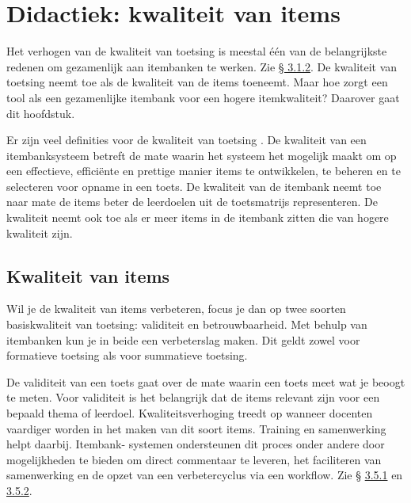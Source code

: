 \documentclass[
]{book}
\begin{document}
\hypertarget{didactiek-kwaliteit-van-items}{%
\section{Didactiek: kwaliteit van items}\label{didactiek-kwaliteit-van-items}}

Het verhogen van de kwaliteit van toetsing is meestal één van de belangrijkste redenen om gezamenlijk aan itembanken te werken. Zie \protect\hyperlink{waarom-samenwerken-aan-een-itembank}{§ 3.1.2}. De kwaliteit van toetsing neemt toe als de kwaliteit van de items toeneemt. Maar hoe zorgt een
tool als een gezamenlijke itembank voor een hogere itemkwaliteit? Daarover gaat dit hoofdstuk.

Er zijn veel definities voor de kwaliteit van toetsing \citep{a061ccfdc1fe4c00bf328e9808c0cb6d}. De kwaliteit van een itembanksysteem betreft de mate waarin het systeem het mogelijk maakt om op een effectieve, efficiënte en prettige manier items te ontwikkelen, te beheren en te selecteren voor opname in een toets. De kwaliteit van de itembank neemt toe naar mate de items beter de leerdoelen uit de toetsmatrijs representeren. De kwaliteit neemt ook toe als er meer items in de itembank zitten die van hogere kwaliteit zijn.

\hypertarget{kwaliteit-van-items}{%
\subsection{Kwaliteit van items}\label{kwaliteit-van-items}}

Wil je de kwaliteit van items verbeteren, focus je dan op twee soorten basiskwaliteit van toetsing: validiteit en betrouwbaarheid. Met behulp van itembanken kun je in beide een verbeterslag maken. Dit geldt zowel voor formatieve toetsing als voor summatieve toetsing.

De validiteit van een toets gaat over de mate waarin een toets meet wat je beoogt te meten. Voor validiteit is het belangrijk dat de items relevant zijn voor een bepaald
thema of leerdoel. Kwaliteitsverhoging treedt op wanneer docenten vaardiger worden in het maken van dit soort items. Training en samenwerking helpt daarbij. Itembank- systemen ondersteunen dit proces onder andere door mogelijkheden te bieden om direct commentaar te leveren, het faciliteren van samenwerking en de opzet van een verbetercyclus via een workflow. Zie § \protect\hyperlink{componenten-en-processtappen}{3.5.1} en \protect\hyperlink{rollen-en-rechten}{3.5.2}.
\end{document}
